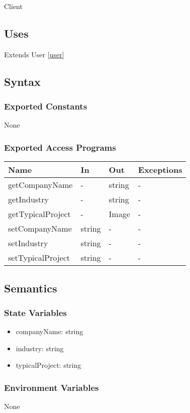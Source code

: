 \documentclass[12pt, titlepage]{article}
\begin{document}
Client

\subsection{Uses}
Extends User \ref{user}

\subsection{Syntax}

\subsubsection{Exported Constants}
None
\subsubsection{Exported Access Programs}

\begin{center}
\begin{tabular}{p{3.2cm} p{4cm} p{4cm} p{2cm}}
\hline
\textbf{Name} & \textbf{In} & \textbf{Out} & \textbf{Exceptions} \\
\hline
getCompanyName & - & string & - \\
getIndustry & - & string & - \\
getTypicalProject & - & Image & - \\
setCompanyName & string & - & - \\
setIndustry & string & - & - \\
setTypicalProject & string & - & - \\
\hline
\end{tabular}
\end{center}

\subsection{Semantics}

\subsubsection{State Variables}
\begin{itemize}
    \item companyName: string
    \item industry: string
    \item typicalProject: string
\end{itemize}
\subsubsection{Environment Variables}
None
\end{document}
